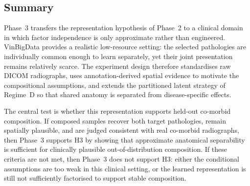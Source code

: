 \subsection{Summary}

Phase~3 transfers the representation hypothesis of Phase~2 to a clinical domain in which factor independence is only approximate rather than engineered.
VinBigData provides a realistic low-resource setting: the selected pathologies are individually common enough to learn separately, yet their joint presentation remains relatively scarce.
The experiment design therefore standardises raw DICOM radiographs, uses annotation-derived spatial evidence to motivate the compositional assumptions, and extends the partitioned latent strategy of Regime~D so that shared anatomy is separated from disease-specific effects.

The central test is whether this representation supports held-out co-morbid composition.
If composed samples recover both target pathologies, remain spatially plausible, and are judged consistent with real co-morbid radiographs, then Phase~3 supports H3 by showing that approximate anatomical separability is sufficient for clinically plausible out-of-distribution composition.
If these criteria are not met, then Phase~3 does not support H3: either the conditional assumptions are too weak in this clinical setting, or the learned representation is still not sufficiently factorised to support stable composition.